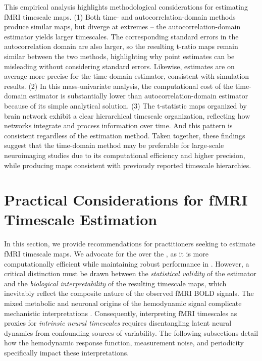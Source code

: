 \documentclass[9pt]{article}
\begin{document}
This empirical analysis highlights methodological considerations for estimating fMRI timescale maps. (1) Both time- and autocorrelation-domain methods produce similar maps, but diverge at extremes -- the autocorrelation-domain estimator yields larger timescales. The corresponding standard errors in the autocorrelation domain are also larger, so the resulting t-ratio maps remain similar between the two methods, highlighting why point estimates can be misleading without considering standard errors.  Likewise, estimates are on average more precise for the time-domain estimator, consistent with simulation results.  (2) In this mass-univariate analysis, the computational cost of the time-domain estimator is substantially lower than autocorrelation-domain estimator because of its simple analytical solution. (3) The t-statistic maps organized by brain network exhibit a clear hierarchical timescale organization, reflecting how networks integrate and process information over time. And this pattern is consistent regardless of the estimation method. Taken together, these findings suggest that the time-domain method may be preferable for large-scale neuroimaging studies due to its computational efficiency and higher precision, while producing maps consistent with previously reported timescale hierarchies.

\section{Practical Considerations for fMRI Timescale Estimation} 

In this section, we provide recommendations for practitioners seeking to estimate fMRI timescale maps. We advocate for the  over the , as it is more computationally efficient while maintaining robust performance in . However, a critical distinction must be drawn between the \textit{statistical validity} of the estimator and the \textit{biological interpretability} of the resulting timescale maps, which inevitably reflect the composite nature of the observed fMRI BOLD signals. The mixed metabolic and neuronal origins of the hemodynamic signal complicate mechanistic interpretations \citep{raut_hierarchical_2020, he_scale-free_2011}. Consequently, interpreting fMRI timescales as proxies for \textit{intrinsic neural timescales} requires disentangling latent neural dynamics from confounding sources of variability. The following subsections detail how the hemodynamic response function, measurement noise, and periodicity specifically impact these interpretations.
\end{document}
